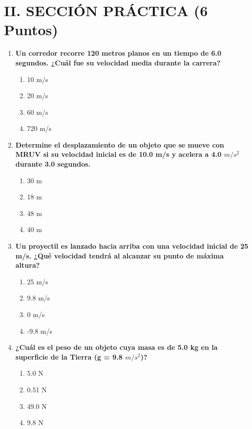 \documentclass[12pt]{article}
\begin{document}
\section*{II. SECCIÓN PRÁCTICA (6 Puntos)}

\begin{enumerate}[label=\arabic*.]
    \item \textbf{Un corredor recorre 120 metros planos en un tiempo de 6.0 segundos. ¿Cuál fue su velocidad media durante la carrera?}
    \begin{enumerate}[label=\alph*)]
        \item 10 m/s
        \item 20 m/s
        \item 60 m/s
        \item 720 m/s
    \end{enumerate}

    \item \textbf{Determine el desplazamiento de un objeto que se mueve con MRUV si su velocidad inicial es de 10.0 m/s y acelera a 4.0 $m/s^2$ durante 3.0 segundos.}
    \begin{enumerate}[label=\alph*)]
        \item 30 m
        \item 18 m
        \item 48 m
        \item 40 m
    \end{enumerate}

    \item \textbf{Un proyectil es lanzado hacia arriba con una velocidad inicial de 25 m/s. ¿Qué velocidad tendrá al alcanzar su punto de máxima altura?}
    \begin{enumerate}[label=\alph*)]
        \item 25 m/s
        \item 9.8 m/s
        \item 0 m/s
        \item -9.8 m/s
    \end{enumerate}

    \item \textbf{¿Cuál es el peso de un objeto cuya masa es de 5.0 kg en la superficie de la Tierra (g = 9.8 $m/s^2$)?}
    \begin{enumerate}[label=\alph*)]
        \item 5.0 N
        \item 0.51 N
        \item 49.0 N
        \item 9.8 N
    \end{enumerate}
\end{enumerate}
\end{document}
